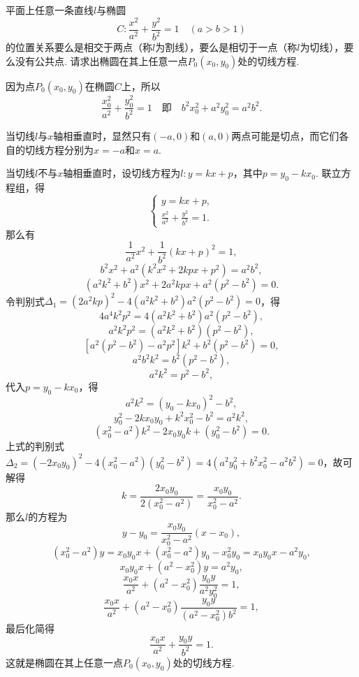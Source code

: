 \begin{example}\label{example:解析几何.椭圆的切线}
平面上任意一条直线\(l\)与椭圆\[
C: \frac{x^2}{a^2} + \frac{y^2}{b^2} = 1 \quad(a>b>1)
\]的位置关系要么是相交于两点（称\(l\)为割线），要么是相切于一点（称\(l\)为切线），要么没有公共点.
请求出椭圆在其上任意一点\(P_0(x_0,y_0)\)处的切线方程.
\begin{solution}
因为点\(P_0(x_0,y_0)\)在椭圆\(C\)上，所以\[
\frac{x_0^2}{a^2} + \frac{y_0^2}{b^2} = 1
\quad\text{即}\quad
b^2 x_0^2 + a^2 y_0^2 = a^2 b^2.
\]

当切线\(l\)与\(x\)轴相垂直时，显然只有\((-a,0)\)和\((a,0)\)两点可能是切点，而它们各自的切线方程分别为\(x=-a\)和\(x=a\).

当切线\(l\)不与\(x\)轴相垂直时，设切线方程为\(l: y = kx + p\)，其中\(p = y_0 - k x_0\).
联立方程组，得\[
\begin{cases}
y = kx + p, \\
\frac{x^2}{a^2} + \frac{y^2}{b^2} = 1.
\end{cases}
\]那么有\[
\frac{1}{a^2} x^2 + \frac{1}{b^2} (kx+p)^2 = 1,
\]\[
b^2 x^2 + a^2 (k^2 x^2 + 2kpx + p^2) = a^2 b^2,
\]\[
(a^2 k^2 + b^2) x^2 + 2 a^2 k p x + a^2 (p^2 - b^2) = 0.
\]令判别式\(\Delta_1 = (2 a^2 k p)^2 - 4 (a^2 k^2 + b^2) a^2 (p^2 - b^2) = 0\)，得\[
4 a^4 k^2 p^2 = 4 (a^2 k^2 + b^2) a^2 (p^2 - b^2),
\]\[
a^2 k^2 p^2 = (a^2 k^2 + b^2)(p^2 - b^2),
\]\[
[a^2 (p^2 - b^2) - a^2 p^2] k^2 + b^2 (p^2 - b^2) = 0,
\]\[
a^2 b^2 k^2 = b^2 (p^2 - b^2),
\]\[
a^2 k^2 = p^2 - b^2,
\]
代入\(p = y_0 - k x_0\)，得\[
a^2 k^2 = (y_0 - k x_0)^2 - b^2,
\]\[
y_0^2 - 2k x_0 y_0 + k^2 x_0^2 - b^2 = a^2 k^2,
\]\[
(x_0^2 - a^2) k^2 - 2 x_0 y_0 k + (y_0^2 - b^2) = 0.
\]上式的判别式\(\Delta_2 = (-2 x_0 y_0)^2 - 4(x_0^2 - a^2)(y_0^2 - b^2)
= 4(a^2 y_0^2 + b^2 x_0^2 - a^2 b^2) = 0\)，故可解得\[
k = \frac{2 x_0 y_0}{2 (x_0^2 - a^2)}
= \frac{x_0 y_0}{x_0^2 - a^2}.
\]那么\(l\)的方程为\[
y - y_0 = \frac{x_0 y_0}{x_0^2 - a^2} (x - x_0),
\]\[
(x_0^2 - a^2) y = x_0 y_0 x + (x_0^2 - a^2) y_0 - x_0^2 y_0
= x_0 y_0 x - a^2 y_0,
\]\[
x_0 y_0 x + (a^2 - x_0^2) y = a^2 y_0,
\]\[
\frac{x_0 x}{a^2} + (a^2 - x_0^2) \frac{y_0 y}{a^2 y_0^2} = 1,
\]\[
\frac{x_0 x}{a^2} + (a^2 - x_0^2) \frac{y_0 y}{(a^2 - x_0^2) b^2} = 1,
\]最后化简得\begin{equation}\label{equation:解析几何.椭圆的切线}
\frac{x_0 x}{a^2} + \frac{y_0 y}{b^2} = 1.
\end{equation}
这就是椭圆在其上任意一点\(P_0(x_0,y_0)\)处的切线方程.
\end{solution}
\end{example}

